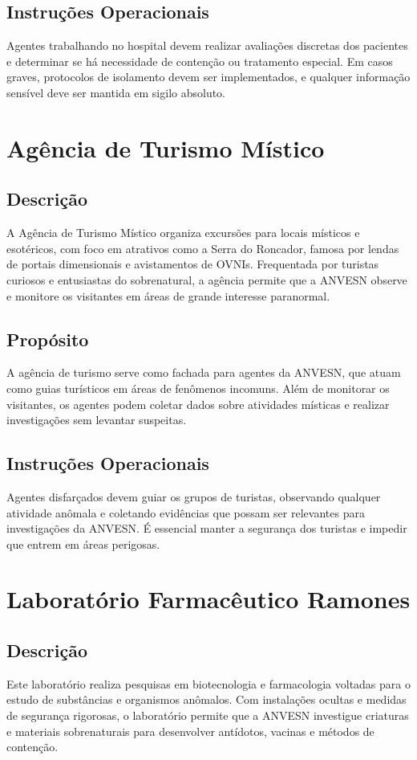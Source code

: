 \documentclass{book}
\begin{document}
\section{Instruções Operacionais}
Agentes trabalhando no hospital devem realizar avaliações discretas dos pacientes e determinar se há necessidade de contenção ou tratamento especial. Em casos graves, protocolos de isolamento devem ser implementados, e qualquer informação sensível deve ser mantida em sigilo absoluto.

\chapter{Agência de Turismo Místico}
\section{Descrição}
A Agência de Turismo Místico organiza excursões para locais místicos e esotéricos, com foco em atrativos como a Serra do Roncador, famosa por lendas de portais dimensionais e avistamentos de OVNIs. Frequentada por turistas curiosos e entusiastas do sobrenatural, a agência permite que a ANVESN observe e monitore os visitantes em áreas de grande interesse paranormal.

\section{Propósito}
A agência de turismo serve como fachada para agentes da ANVESN, que atuam como guias turísticos em áreas de fenômenos incomuns. Além de monitorar os visitantes, os agentes podem coletar dados sobre atividades místicas e realizar investigações sem levantar suspeitas.

\section{Instruções Operacionais}
Agentes disfarçados devem guiar os grupos de turistas, observando qualquer atividade anômala e coletando evidências que possam ser relevantes para investigações da ANVESN. É essencial manter a segurança dos turistas e impedir que entrem em áreas perigosas.

\chapter{Laboratório Farmacêutico Ramones}
\section{Descrição}
Este laboratório realiza pesquisas em biotecnologia e farmacologia voltadas para o estudo de substâncias e organismos anômalos. Com instalações ocultas e medidas de segurança rigorosas, o laboratório permite que a ANVESN investigue criaturas e materiais sobrenaturais para desenvolver antídotos, vacinas e métodos de contenção.
\end{document}
